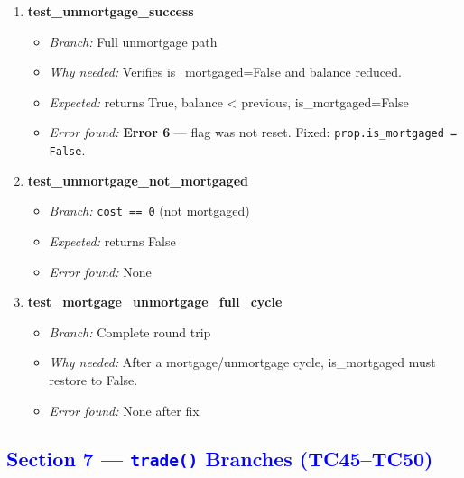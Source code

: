 \documentclass{article}
\begin{document}
\begin{enumerate}[resume, label=\textbf{TC\arabic*.}]
  \item \textbf{test\_unmortgage\_success}
  \begin{itemize}[noitemsep]
    \item \textit{Branch:} Full unmortgage path
    \item \textit{Why needed:} Verifies is\_mortgaged=False and balance reduced.
    \item \textit{Expected:} returns True, balance < previous, is\_mortgaged=False
    \item \textit{Error found:} \textbf{Error 6} — flag was not reset. Fixed: \texttt{prop.is\_mortgaged = False}.
  \end{itemize}

  \item \textbf{test\_unmortgage\_not\_mortgaged}
  \begin{itemize}[noitemsep]
    \item \textit{Branch:} \texttt{cost == 0} (not mortgaged)
    \item \textit{Expected:} returns False
    \item \textit{Error found:} None
  \end{itemize}

  \item \textbf{test\_mortgage\_unmortgage\_full\_cycle}
  \begin{itemize}[noitemsep]
    \item \textit{Branch:} Complete round trip
    \item \textit{Why needed:} After a mortgage/unmortgage cycle, is\_mortgaged must restore to False.
    \item \textit{Error found:} None after fix
  \end{itemize}

\end{enumerate}

\subsection*{\textcolor{blue}{Section 7 — \texttt{trade()} Branches (TC45--TC50)}}
\end{document}
